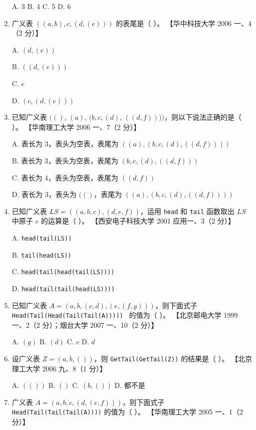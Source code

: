 \documentclass[lang=cn,newtx,10pt,scheme=chinese]{../../elegantbook}
\begin{document}
\begin{enumerate}
    A. 3 \quad B. 4 \quad C. 5 \quad D. 6  

    \item 广义表 $((a, b), c, (d, (e)))$ 的表尾是（ ）。  
    【华中科技大学 2006 一、4（2 分）】  

    A. $(d, (e))$  

    B. $((d, (e)))$  

    C. $e$  

    D. $(c, (d, (e)))$  

    \item 已知广义表 $(()$, $(a)$, $(b, c, (d)$, $((d, f))))$，则以下说法正确的是（ ）。  
    【华南理工大学 2006 一、7（2 分）】  

    A. 表长为 3，表头为空表，表尾为 $((a), (b, c, (d), ((d, f))))$  

    B. 表长为 3，表头为空表，表尾为 $(b, c, (d), ((d, f)))$  

    C. 表长为 4，表头为空表，表尾为 $((d, f))$  

    D. 表长为 3，表头为 $(()$，表尾为 $((a), (b, c, (d), ((d, f))))$  

    \item 已知广义表 $LS = ((a, b, c), (d, e, f))$，运用 \texttt{head} 和 \texttt{tail} 函数取出 $LS$ 中原子 $e$ 的运算是（ ）。  
    【西安电子科技大学 2001 应用一、3（2 分）】

    A. \texttt{head(tail(LS))}  

    B. \texttt{tail(head(LS))}  

    C. \texttt{head(tail(head(tail(LS))))}  

    D. \texttt{head(tail(tail(head(LS))))}  

    \item 已知广义表 $A = (a, b, (c, d), (e, (f, g)))$，则下面式子 \texttt{Head(Tail(Head(Tail(Tail(A))))) } 的值为（ ）。  
    【北京邮电大学 1999 一、2（2 分）；烟台大学 2007 一、10（2 分）】

    A. $(g)$ \quad B. $(d)$ \quad C. $c$ \quad D. $d$  

    \item 设广义表 $Z = (a, b, ())$，则 \texttt{GetTail(GetTail(Z))} 的结果是（ ）。  
    【北京理工大学 2006 九、8（1 分）】  

    A. $(())$ \quad B. $()$ \quad C. $(b, ())$ \quad D. 都不是  

    \item 广义表 $A = (a, b, c, (d, (e, f)))$，则下面式子 \texttt{Head(Tail(Tail(Tail(A))))} 的值为（ ）。  
    【华南理工大学 2005 一、1（2 分）】  


\end{enumerate}
\end{document}
